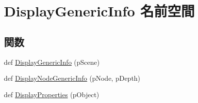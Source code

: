 \hypertarget{namespace_display_generic_info}{}\section{Display\+Generic\+Info 名前空間}
\label{namespace_display_generic_info}
\subsection*{関数}
\begin{DoxyCompactItemize}
\item 
def \hyperlink{namespace_display_generic_info_a4b18a2c8214b64abe8747ef67948cecf}{Display\+Generic\+Info} (p\+Scene)
\item 
def \hyperlink{namespace_display_generic_info_abb5d03bf361368bbe20b440e69bfaf99}{Display\+Node\+Generic\+Info} (p\+Node, p\+Depth)
\item 
def \hyperlink{namespace_display_generic_info_a5df606a5fc66507df9713e52a7fc5fa2}{Display\+Properties} (p\+Object)
\end{DoxyCompactItemize}


